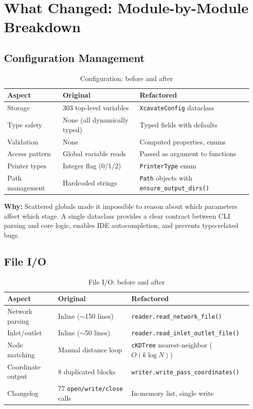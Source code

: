 \documentclass[11pt,a4paper]{article}
\begin{document}
\section{What Changed: Module-by-Module Breakdown}

\subsection{Configuration Management}

\begin{table}[H]
\centering
\caption{Configuration: before and after}
\begin{tabularx}{\textwidth}{lXX}
\toprule
\textbf{Aspect} & \textbf{Original} & \textbf{Refactored} \\
\midrule
Storage & 303 top-level variables & \texttt{XcavateConfig} dataclass \\
Type safety & None (all dynamically typed) & Typed fields with defaults \\
Validation & None & Computed properties, enums \\
Access pattern & Global variable reads & Passed as argument to functions \\
Printer types & Integer flag (0/1/2) & \texttt{PrinterType} enum \\
Path management & Hardcoded strings & \texttt{Path} objects with \texttt{ensure\_output\_dirs()} \\
\bottomrule
\end{tabularx}
\end{table}

\textbf{Why:} Scattered globals made it impossible to reason about which parameters affect which stage. A single dataclass provides a clear contract between CLI parsing and core logic, enables IDE autocompletion, and prevents typo-related bugs.

\subsection{File I/O}

\begin{table}[H]
\centering
\caption{File I/O: before and after}
\begin{tabularx}{\textwidth}{lXX}
\toprule
\textbf{Aspect} & \textbf{Original} & \textbf{Refactored} \\
\midrule
Network parsing & Inline ($\sim$150 lines) & \texttt{reader.read\_network\_file()} \\
Inlet/outlet & Inline ($\sim$50 lines) & \texttt{reader.read\_inlet\_outlet\_file()} \\
Node matching & Manual distance loop & \texttt{cKDTree} nearest-neighbor ($O(k \log N)$) \\
Coordinate output & 8 duplicated blocks & \texttt{writer.write\_pass\_coordinates()} \\
Changelog & 77 \texttt{open/write/close} calls & In-memory list, single write \\
\bottomrule
\end{tabularx}
\end{table}
\end{document}
